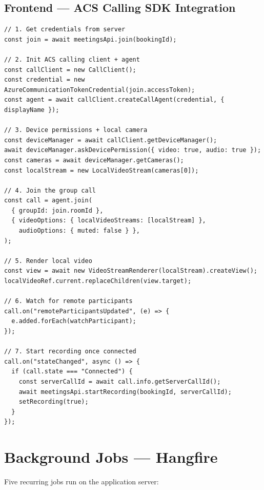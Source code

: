 \documentclass[11pt,a4paper]{article}
\begin{document}
\subsection{Frontend --- ACS Calling SDK Integration}

\begin{lstlisting}[caption={Meeting.tsx --- SDK bootstrap (condensed)}]
// 1. Get credentials from server
const join = await meetingsApi.join(bookingId);

// 2. Init ACS calling client + agent
const callClient = new CallClient();
const credential = new AzureCommunicationTokenCredential(join.accessToken);
const agent = await callClient.createCallAgent(credential, { displayName });

// 3. Device permissions + local camera
const deviceManager = await callClient.getDeviceManager();
await deviceManager.askDevicePermission({ video: true, audio: true });
const cameras = await deviceManager.getCameras();
const localStream = new LocalVideoStream(cameras[0]);

// 4. Join the group call
const call = agent.join(
  { groupId: join.roomId },
  { videoOptions: { localVideoStreams: [localStream] },
    audioOptions: { muted: false } },
);

// 5. Render local video
const view = await new VideoStreamRenderer(localStream).createView();
localVideoRef.current.replaceChildren(view.target);

// 6. Watch for remote participants
call.on("remoteParticipantsUpdated", (e) => {
  e.added.forEach(watchParticipant);
});

// 7. Start recording once connected
call.on("stateChanged", async () => {
  if (call.state === "Connected") {
    const serverCallId = await call.info.getServerCallId();
    await meetingsApi.startRecording(bookingId, serverCallId);
    setRecording(true);
  }
});
\end{lstlisting}

\section{Background Jobs --- Hangfire}

Five recurring jobs run on the application server:
\end{document}
